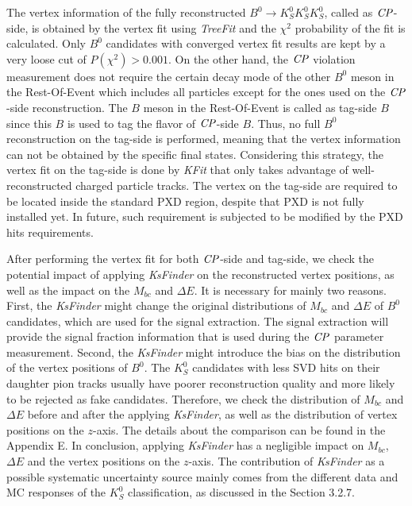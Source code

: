 The vertex information of the fully reconstructed $B^0 \to K_S^0  K_S^0  K_S^0$, called as $\it{CP}$-side, is obtained by the vertex fit using \textit{TreeFit} and the $\chi^2$ probability of the fit is calculated.  Only $B^0$ candidates with converged vertex fit results are kept by a very loose cut of  $P(\chi^2)> 0.001$. On the other hand, the $\it{CP}$ violation measurement does not require the certain decay mode of the other $B^0$ meson in the Rest-Of-Event which includes all particles except for the ones used on the $\it{CP}$-side reconstruction. The $B$ meson in the Rest-Of-Event is called as tag-side $B$ since this $B$ is used to tag the flavor of $\it{CP}$-side $B$. Thus, no full $B^0$ reconstruction on the tag-side is performed, meaning that the vertex information can not be obtained by the specific final states. Considering this strategy, the vertex fit on the tag-side is done by \textit{KFit} that only takes advantage of well-reconstructed charged particle tracks. The vertex on the tag-side are required to be located inside the standard PXD region, despite that PXD is not fully installed yet. In future, such requirement is subjected to be modified by the PXD hits requirements. 
 
 After performing the vertex fit for both $\it{CP}$-side and tag-side, we check the potential impact of applying \textit{KsFinder} on the reconstructed vertex positions, as well as the impact on the $M_{bc}$ and $\Delta E$. It is necessary for mainly two reasons. First, the \textit{KsFinder} might change the original distributions of $M_{bc}$ and $\Delta E$ of $B^0$ candidates, which are used for the signal extraction. The signal extraction will provide the signal fraction information that is used during the $\it{CP}$ parameter measurement. Second, the \textit{KsFinder} might introduce the bias on the distribution of the vertex positions of $B^0$. The $K_S^0$ candidates with less SVD hits on their daughter pion tracks usually have poorer reconstruction quality and more likely to be rejected as fake candidates. Therefore, we check the distribution of $M_{bc}$ and $\Delta E$ before and after the applying \textit{KsFinder}, as well as the distribution of vertex positions on the $z$-axis. The details about the comparison can be found in the Appendix E. In conclusion, applying \textit{KsFinder} has a negligible impact on $M_{bc}$, $\Delta E$ and the vertex positions on the $z$-axis. The contribution of \textit{KsFinder} as a possible systematic uncertainty source mainly comes from the different data and MC responses of the $K_S^0$ classification, as discussed in the Section 3.2.7. 
 
